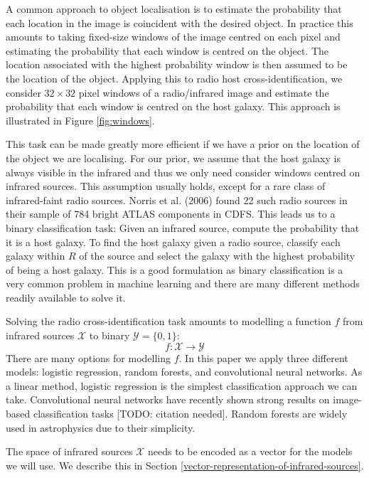 \documentclass[fleqn,usenatbib,usedcolumn]{mnras}
\begin{document}
    A common approach to object localisation is to estimate the probability
    that each location in the image is coincident with the desired object. In
    practice this amounts to taking fixed-size windows of the image centred on
    each pixel and estimating the probability that each window is centred on
    the object. The location associated with the highest probability window is
    then assumed to be the location of the object. Applying this to radio host
    cross-identification, we consider $32 \times 32$ pixel windows of a
    radio/infrared image and estimate the probability that each window is
    centred on the host galaxy. This approach is illustrated in Figure
    \ref{fig:windows}.

    This task can be made greatly more efficient if we have a prior on the
    location of the object we are localising. For our prior, we assume that
    the host galaxy is always visible in the infrared and thus we only need
    consider windows centred on infrared sources. This assumption usually
    holds, except for a rare class of infrared-faint radio sources. Norris et
    al. (2006) found 22 such radio sources in their sample of 784 bright ATLAS
    components in CDFS. This leads us to a binary classification task: Given
    an infrared source, compute the probability that it is a host galaxy. To
    find the host galaxy given a radio source, classify each galaxy within
    \(R\) of the source and select the galaxy with the highest probability of
    being a host galaxy. This is a good formulation as binary classification
    is a very common problem in machine learning and there are many different
    methods readily available to solve it.

    Solving the radio cross-identification task amounts to modelling a
    function \(f\) from infrared sources \(\mathcal{X}\) to binary
    \(\mathcal{Y} = \{0, 1\}\): \[
        f : \mathcal{X} \to \mathcal{Y}
    \] There are many options for modelling \(f\). In this paper we apply
    three different models: logistic regression, random forests, and
    convolutional neural networks. As a linear method, logistic regression is
    the simplest classification approach we can take. Convolutional neural
    networks have recently shown strong results on image-based classification
    tasks [TODO: citation needed]. Random forests are widely used in
    astrophysics due to their simplicity.

    The space of infrared sources \(\mathcal{X}\) needs to be encoded as a
    vector for the models we will use. We describe this in Section
    \ref{vector-representation-of-infrared-sources}.
\end{document}
